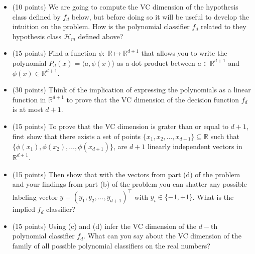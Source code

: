 \documentclass{article}
\begin{document}
\begin{itemize}[(a)]
    \item (10 points) We are going to compute the VC dimension of the hypothesis class defined by $f_{d}$ below, but before doing so     it will be useful to develop the intuition on the problem. How is the polynomial classifier $f_{d}$ related to they hypothesis class $\mathcal{H}_m$ defined above?
\end{itemize}  
\begin{itemize}[(b)]
    \item (15 points) Find a function $\phi:\; \mathbb{R} \mapsto \mathbb{R}^{d+1}$ that allows you to write the polynomial $P_d(x) = \langle a, \phi(x) \rangle$ as a dot product between $a\in \mathbb{R}^{d+1}$ and $\phi(x) \in \mathbb{R}^{d+1}$.
\end{itemize}
\begin{itemize}[(c)]
    \item (30 points) Think of the implication of expressing the polynomials as a linear function in $\mathbb{R}^{d+1}$ to prove that the VC dimension of the decision function $f_{d}$ is at most $d+1$.
\end{itemize}
\begin{itemize}[(d)]
    \item (15 points) To prove that the VC dimension is grater than or equal to  $d+1$, first show that there exists a set of points $\{x_{1},x_{2},\dots,x_{d+1}\} \subseteq \mathbb{R}$ such that $\{\phi(x_{1}),\phi(x_{2}),\dots,\phi(x_{d+1})\}$, are $d+1$ linearly independent vectors in $\mathbb{R}^{d+1}$.  
    \item (15 points) Then show that with the vectors from part (d) of the problem and your findings from part (b) of the problem you can shatter any possible labeling vector $y = (y_1, y_2, \dots, y_{d+1})^{\intercal}$ with $y_{i} \in \{-1,+1\}$. What is the implied $f_d$ classifier?
\end{itemize}
\begin{itemize}[(e)]
    \item (15 points) Using (c) and (d) infer the VC dimension of the $d-$th polynomial classifier $f_{d}$. What can you say about the VC dimension of the family of all possible polynomial classifiers on the real numbers?
\end{itemize}
\end{document}
